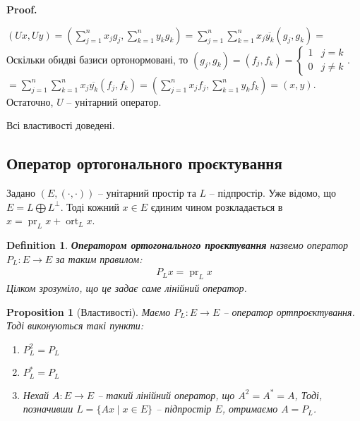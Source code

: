 \documentclass[a4paper, 10pt]{article}
\makeatletter
\theoremstyle{theoremdd}
\newtheorem{definition}[theorem]{Definition}
\newtheorem{proposition}[theorem]{Proposition}
\DeclareMathOperator{\ort}{ort}
\DeclareMathOperator{\pr}{pr}
\renewenvironment{proof}[1][Proof.\\]{\par
\pushQED{\hfill \qed}%
\normalfont \topsep6\p@\@plus6\p@\relax
\trivlist
\item\relax
{\bfseries
#1\@addpunct{.}}\hspace\labelsep\ignorespaces
}{%
\popQED\endtrivlist\@endpefalse
}
\makeatother
\begin{document}
\begin{proof}
\begin{enumerate}[topsep=-\parskip, wide=0pt, label={\arabic*)}]
$\displaystyle (Ux, Uy) = \left(\sum_{j=1}^n x_j g_j, \sum_{k=1}^n y_k g_k \right) = \sum_{j=1}^n \sum_{k=1}^n x_j \overline{y_k} (g_j,g_k) \boxed{=}$\\
Оскільки обидві базиси ортонормовані, то $(g_j,g_k) = (f_j,f_k) = \begin{cases} 1 & j = k \\ 0 & j \neq k \end{cases}$.\\
$\boxed{=} \displaystyle \sum_{j=1}^n \sum_{k=1}^n x_j \overline{y_k} (f_j,f_k) = \left(\sum_{j=1}^n x_jf_j, \sum_{k=1}^n y_k f_k \right) = (x,y)$.\\
Остаточно, $U$ -- унітарний оператор.
\end{enumerate}
Всі властивості доведені.
\end{proof}

\subsection{Оператор ортогонального проєктування}
Задано $(E,(\cdot,\cdot))$ -- унітарний простір та $L$ -- підпростір. Уже відомо, що $E = L \bigoplus L^{\perp}$. Тоді кожний $x \in E$ єдиним чином розкладається в $x = \pr_L x + \ort_L x$.

\begin{definition}
\textbf{Оператором ортогонального проєктування} назвемо оператор $P_L \colon E \to E$ за таким правилом:
\begin{align*}
P_L x = \pr_L x
\end{align*}
Цілком зрозуміло, що це задає саме лінійний оператор.
\end{definition}

\begin{proposition}[Властивості]
Маємо $P_L \colon E \to E$ -- оператор ортпроєктування. Тоді виконуються такі пункти:
\begin{enumerate}[nosep,wide=0pt,label={\arabic*)}]
\item $P_L^2 = P_L$
\item $P^*_L = P_L$
\item Нехай $A \colon E \to E$ -- такий лінійний оператор, що $A^2 = A^* = A$, Тоді, позначивши $L = \{Ax \mid x \in E\}$ -- підпростір $E$, отримаємо $A = P_L$.
\end{enumerate}
\end{proposition}
\end{document}
